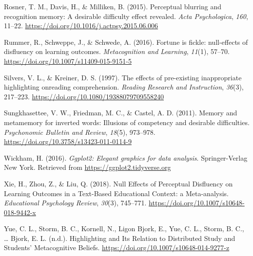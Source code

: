 \documentclass[english,pdf]{apa6}
\begin{document}
\leavevmode\hypertarget{ref-Rosner2015}{}%
Rosner, T. M., Davis, H., \& Milliken, B. (2015). Perceptual blurring and recognition memory: A desirable difficulty effect revealed. \emph{Acta Psychologica}, \emph{160}, 11--22. \url{https://doi.org/10.1016/j.actpsy.2015.06.006}

\leavevmode\hypertarget{ref-Rummer2016}{}%
Rummer, R., Schweppe, J., \& Schwede, A. (2016). Fortune is fickle: null-effects of disfluency on learning outcomes. \emph{Metacognition and Learning}, \emph{11}(1), 57--70. \url{https://doi.org/10.1007/s11409-015-9151-5}

\leavevmode\hypertarget{ref-Silvers1997}{}%
Silvers, V. L., \& Kreiner, D. S. (1997). The effects of pre-existing inappropriate highlighting onreading comprehension. \emph{Reading Research and Instruction}, \emph{36}(3), 217--223. \url{https://doi.org/10.1080/19388079709558240}

\leavevmode\hypertarget{ref-Sungkhasettee2011}{}%
Sungkhasettee, V. W., Friedman, M. C., \& Castel, A. D. (2011). Memory and metamemory for inverted words: Illusions of competency and desirable difficulties. \emph{Psychonomic Bulletin and Review}, \emph{18}(5), 973--978. \url{https://doi.org/10.3758/s13423-011-0114-9}

\leavevmode\hypertarget{ref-Wickham2016}{}%
Wickham, H. (2016). \emph{Ggplot2: Elegant graphics for data analysis}. Springer-Verlag New York. Retrieved from \url{https://ggplot2.tidyverse.org}

\leavevmode\hypertarget{ref-Xie2018}{}%
Xie, H., Zhou, Z., \& Liu, Q. (2018). Null Effects of Perceptual Disfluency on Learning Outcomes in a Text-Based Educational Context: a Meta-analysis. \emph{Educational Psychology Review}, \emph{30}(3), 745--771. \url{https://doi.org/10.1007/s10648-018-9442-x}

\leavevmode\hypertarget{ref-Yue}{}%
Yue, C. L., Storm, B. C., Kornell, N., Ligon Bjork, E., Yue, C. L., Storm, B. C., \ldots{} Bjork, E. L. (n.d.). Highlighting and Its Relation to Distributed Study and Students' Metacognitive Beliefs. \url{https://doi.org/10.1007/s10648-014-9277-z}

\endgroup

\clearpage
\theendnotes
\end{document}
